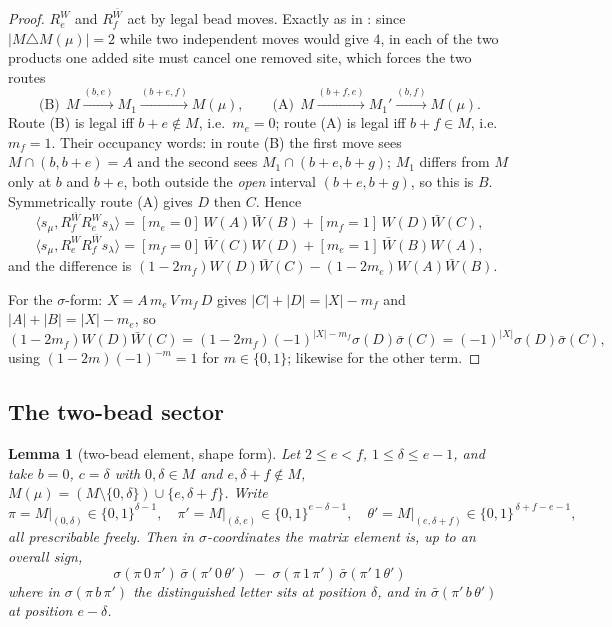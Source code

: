 \documentclass[11pt]{article}
\newtheorem{lemma}[theorem]{Lemma}
\theoremstyle{definition}
\theoremstyle{remark}
\begin{document}
\begin{proof}
$R_e^{W}$ and $R_f^{\bar W}$ act by legal bead moves.  Exactly as in \cite{Q147}: since
$|M\triangle M(\mu)|=2$ while two independent moves would give $4$, in each of the two
products one added site must cancel one removed site, which forces the two routes
\[
  \text{(B)}\ \ M\xrightarrow{(b,e)}M_1\xrightarrow{(b+e,f)}M(\mu),\qquad
  \text{(A)}\ \ M\xrightarrow{(b+f,e)}M_1'\xrightarrow{(b,f)}M(\mu).
\]
Route (B) is legal iff $b+e\notin M$, i.e.\ $m_e=0$; route (A) is legal iff $b+f\in M$,
i.e.\ $m_f=1$.  Their occupancy words: in route (B) the first move sees
$M\cap(b,b+e)=A$ and the second sees $M_1\cap(b+e,b+g)$; $M_1$ differs from $M$ only at
$b$ and $b+e$, both outside the \emph{open} interval $(b+e,b+g)$, so this is $B$.
Symmetrically route (A) gives $D$ then $C$.  Hence
\[
   \langle s_\mu, R_f^{\bar W}R_e^{W}s_\lambda\rangle=[m_e=0]\,W(A)\bar W(B)
     +[m_f=1]\,W(D)\bar W(C),
\]
\[
   \langle s_\mu, R_e^{W}R_f^{\bar W}s_\lambda\rangle=[m_f=0]\,\bar W(C)W(D)
     +[m_e=1]\,\bar W(B)W(A),
\]
and the difference is $(1-2m_f)W(D)\bar W(C)-(1-2m_e)W(A)\bar W(B)$.

For the $\sigma$-form: $X=A\,m_e\,V\,m_f\,D$ gives $|C|+|D|=|X|-m_f$ and
$|A|+|B|=|X|-m_e$, so
\[
  (1-2m_f)W(D)\bar W(C)=(1-2m_f)(-1)^{|X|-m_f}\sigma(D)\bar\sigma(C)
   =(-1)^{|X|}\sigma(D)\bar\sigma(C),
\]
using $(1-2m)(-1)^{-m}=1$ for $m\in\{0,1\}$; likewise for the other term.
\end{proof}

\subsection{The two-bead sector}

\begin{lemma}[two-bead element, shape form]\label{lem:twobead}
Let $2\le e<f$, $1\le\delta\le e-1$, and take $b=0$, $c=\delta$ with $0,\delta\in M$ and
$e,\delta+f\notin M$, $M(\mu)=(M\setminus\{0,\delta\})\cup\{e,\delta+f\}$.  Write
\[
  \pi=M\big|_{(0,\delta)}\in\{0,1\}^{\delta-1},\quad
  \pi'=M\big|_{(\delta,e)}\in\{0,1\}^{e-\delta-1},\quad
  \theta'=M\big|_{(e,\delta+f)}\in\{0,1\}^{\,\delta+f-e-1},
\]
all prescribable freely.  Then in $\sigma$-coordinates the matrix element is, up to an
overall sign,
\begin{equation}\label{eq:2B}
  \boxed{\ \sigma(\pi\,0\,\pi')\,\bar\sigma(\pi'\,0\,\theta')
        \;-\;\sigma(\pi\,1\,\pi')\,\bar\sigma(\pi'\,1\,\theta')\ }
\end{equation}
where in $\sigma(\pi\,b\,\pi')$ the distinguished letter sits at position $\delta$, and in
$\bar\sigma(\pi'\,b\,\theta')$ at position $e-\delta$.
\end{lemma}
\end{document}
